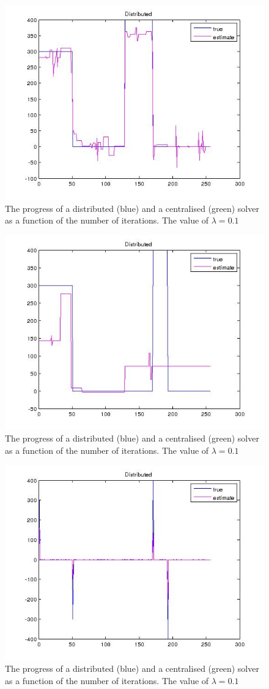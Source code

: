 \documentclass{article}
\begin{document}
\begin{figure}[h]
\centering
\includegraphics[height = 7.3 cm]{recon170815.jpg}
\caption{The progress of a distributed (blue) and a centralised (green) solver as a function of the number of iterations. The value of \(\lambda = 0.1\)}
\label{fig:wavelet_recon}
\end{figure}

\begin{figure}[h]
\centering
\includegraphics[height = 7.3 cm]{recon_new_bar.jpg}
\caption{The progress of a distributed (blue) and a centralised (green) solver as a function of the number of iterations. The value of \(\lambda = 0.1\)}
\label{fig:wavelet_recon_no_pwer_2}
\end{figure}

\begin{figure}[h]
\centering
\includegraphics[height = 7.3 cm]{recon_difference.jpg}
\caption{The progress of a distributed (blue) and a centralised (green) solver as a function of the number of iterations. The value of \(\lambda = 0.1\)}
\label{fig:erroriterations}
\end{figure}
\end{document}

